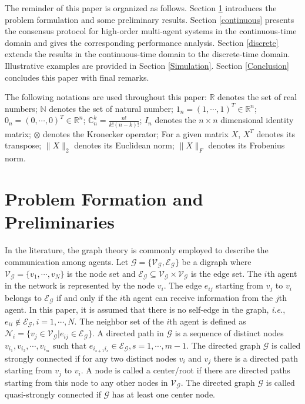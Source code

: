 \documentclass[12pt,draftcls,onecolumn]{IEEEtran}
\begin{document}
The reminder of this paper is organized as follows. Section {\ref{Problem}} introduces the problem formulation and some
preliminary results. Section {\ref{continuous}} presents the consensus protocol for high-order multi-agent systems in the continuous-time domain and gives the corresponding performance analysis. Section {\ref{discrete}} extends the results in the continuous-time domain to the discrete-time domain. Illustrative examples  are provided in Section {\ref{Simulation}}. Section {\ref{Conclusion}} concludes this paper
with final remarks.

The following notations are used throughout this paper: $\mathbb{R}$ denotes the set of real numbers; $\mathbb{N}$ denotes the set of natural number; $1_n = (1,\cdots,1)^T \in
\mathbb{R}^n$; $0_n = (0,\cdots,0)^T \in \mathbb{R}^n$; $\mathbb{C}^k_n = \frac{n!}{k!(n-k)!}$; $I_n$ denotes the $n\times n$ dimensional
identity matrix; $\otimes$ denotes the Kronecker operator;
For a given matrix $X$, $X^T$ denotes its transpose; $\|X\|_2$ denotes its Euclidean norm; $\|X\|_F$ denotes its Frobenius norm.



\section{Problem Formation and Preliminaries}\label{Problem}
In the literature, the graph theory is commonly employed to describe the communication among agents.
Let $\mathcal{G} = \{\mathcal{V}_\mathcal{G}, \mathcal{E}_\mathcal{G}\}$ be a digraph where $\mathcal{V}_\mathcal{G} = \{v_1,\cdots,v_N\}$ is the node
set and $\mathcal{E}_\mathcal{G} \subseteq \mathcal{V}_\mathcal{G} \times \mathcal{V}_\mathcal{G}$ is the edge set. The $i$th agent in the network is
represented by the node $v_i$. The edge $e_{ij}$ starting from $v_j$ to $v_i$ belongs to $\mathcal{E}_\mathcal{G}$ if and only if the $i$th agent can
receive information from the $j$th agent. In this paper, it is assumed that there is no self-edge in the graph,
\emph{i.e.}, $e_{ii} \notin \mathcal{E}_\mathcal{G}, i=1,\cdots,N$. The neighbor set of the $i$th agent is defined
as $\mathcal{N}_i = \{v_j \in \mathcal{V}_\mathcal{G} | e_{ij} \in \mathcal{E}_\mathcal{G}\}$. A directed path in $\mathcal{G}$ is a sequence of
distinct nodes $v_{i_1},v_{i_2},\cdots,v_{i_m}$ such that $e_{i_{s+1}i_s} \in \mathcal{E}_\mathcal{G}, s=1,\cdots,m-1$. The directed graph $\mathcal{G}$ is
called strongly connected if for any two distinct nodes $v_i$ and $v_j$ there is a directed path starting from $v_j$ to $v_i$. A node is called a center/root
if there are directed paths starting from this node to any other nodes in $\mathcal{V}_\mathcal{G}$. The directed graph $\mathcal{G}$ is called
quasi-strongly connected if $\mathcal{G}$ has at least one center node.  
\end{document}
